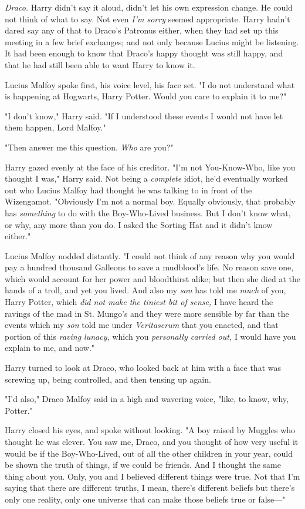 \emph{Draco.} Harry didn't say it aloud, didn't let his own expression change. 
He could not think of what to say. Not even \emph{I'm sorry} seemed 
appropriate. Harry hadn't dared say any of that to Draco's Patronus either, 
when they had set up this meeting in a few brief exchanges; and not only 
because Lucius might be listening. It had been enough to know that Draco's 
happy thought was still happy, and that he had still been able to want Harry to 
know it.

Lucius Malfoy spoke first, his voice level, his face set. "I do not understand 
what is happening at Hogwarts, Harry Potter. Would you care to explain it to 
me?"

"I don't know," Harry said. "If I understood these events I would not have let 
them happen, Lord Malfoy."

"Then answer me this question. \emph{Who} are you?"

Harry gazed evenly at the face of his creditor. "I'm not You-Know-Who, like you 
thought I was," Harry said. Not being a \emph{complete} idiot, he'd eventually 
worked out who Lucius Malfoy had thought he was talking to in front of the 
Wizengamot. "Obviously I'm not a normal boy. Equally obviously, that probably 
has \emph{something} to do with the Boy-Who-Lived business. But I don't know 
what, or why, any more than you do. I asked the Sorting Hat and it didn't know 
either."

Lucius Malfoy nodded distantly. "I could not think of any reason why you would 
pay a hundred thousand Galleons to save a mudblood's life. No reason save one, 
which would account for her power and bloodthirst alike; but then she died at 
the hands of a troll, and yet you lived. And also my \emph{son} has told me 
\emph{much} of you, Harry Potter, which \emph{did not make the tiniest bit of 
sense,} I have heard the ravings of the mad in St. Mungo's and they were more 
sensible by far than the events which my \emph{son} told me under 
\emph{Veritaserum} that you enacted, and that portion of this \emph{raving 
lunacy,} which you \emph{personally carried out,} I would have you explain to 
me, and now."

Harry turned to look at Draco, who looked back at him with a face that was 
screwing up, being controlled, and then tensing up again.

"I'd also," Draco Malfoy said in a high and wavering voice, "like, to know, 
why, Potter."

Harry closed his eyes, and spoke without looking. "A boy raised by Muggles who 
thought he was clever. You saw me, Draco, and you thought of how very useful it 
would be if the Boy-Who-Lived, out of all the other children in your year, 
could be shown the truth of things, if we could be friends. And I thought the 
same thing about you. Only, you and I believed different things were true. Not 
that I'm saying that there are different truths, I mean, there's different 
beliefs but there's only one reality, only one universe that can make those 
beliefs true or false---"


